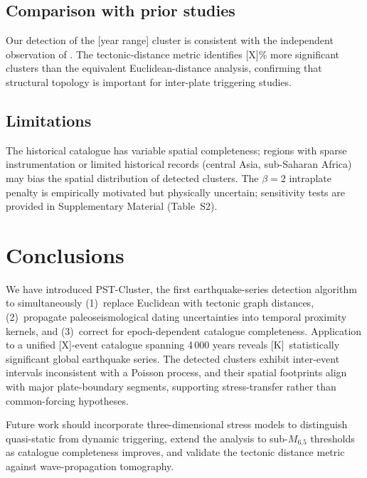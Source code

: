 \documentclass[draft]{agujournal2019}
\begin{document}
\subsection{Comparison with prior studies}

Our detection of the [year range] cluster is consistent with the
independent observation of \citet{[Author]}.  The tectonic-distance
metric identifies [X]\% more significant clusters than the equivalent
Euclidean-distance analysis, confirming that structural topology is
important for inter-plate triggering studies.

\subsection{Limitations}

The historical catalogue has variable spatial completeness; regions with
sparse instrumentation or limited historical records (central Asia, sub-Saharan
Africa) may bias the spatial distribution of detected clusters.
The $\beta = 2$ intraplate penalty is empirically motivated but physically
uncertain; sensitivity tests are provided in Supplementary Material (Table~S2).

\section{Conclusions}
\label{sec:conclusions}

We have introduced PST-Cluster, the first earthquake-series detection algorithm
to simultaneously (1)~replace Euclidean with tectonic graph distances,
(2)~propagate paleoseismological dating uncertainties into temporal proximity
kernels, and (3)~correct for epoch-dependent catalogue completeness.
Application to a unified [X]-event catalogue spanning 4\,000 years reveals
[K]~statistically significant global earthquake series.  The detected
clusters exhibit inter-event intervals inconsistent with a Poisson process,
and their spatial footprints align with major plate-boundary segments,
supporting stress-transfer rather than common-forcing hypotheses.

Future work should incorporate three-dimensional stress models to distinguish
quasi-static from dynamic triggering, extend the analysis to sub-$M_6.5$
thresholds as catalogue completeness improves, and validate the tectonic
distance metric against wave-propagation tomography.

\end{document}
